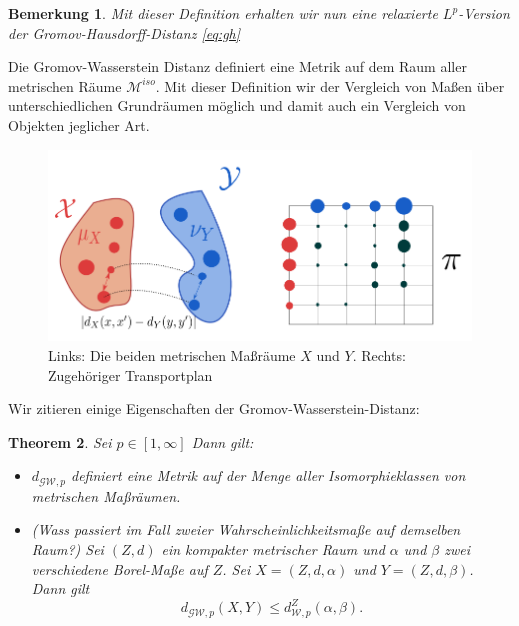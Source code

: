 \documentclass[11pt,a4paper]{article}
\newtheorem{theorem}{Theorem}[subsection]
\newtheorem{remark}[theorem]{Bemerkung}
\numberwithin{equation}{section}
\begin{document}
	\begin{remark}
		Mit dieser Definition erhalten wir nun eine relaxierte $L^p$-Version der Gromov-Hausdorff-Distanz \autoref{eq:gh}
	\end{remark}
	Die Gromov-Wasserstein Distanz definiert eine Metrik auf dem Raum aller metrischen Räume $\mathcal{M}^{iso}$. 
	Mit dieser Definition wir der Vergleich von Maßen über unterschiedlichen Grundräumen möglich und damit auch ein Vergleich von Objekten jeglicher Art.
	
	\begin{figure}[h]
		\begin{center}
			\includegraphics[width=0.3\textheight]{gwd_Transportplan.png}
			\caption[Beispiel der Gromov-Wasserstein-Distanz]{Links: Die beiden metrischen Maßräume $X$ und $Y$. Rechts: Zugehöriger Transportplan}
		\end{center}
	\end{figure}
	
	Wir zitieren einige Eigenschaften der Gromov-Wasserstein-Distanz:
	
	\begin{theorem}\cite[Thm. 5.1]{memoli2011gromov} Sei $p \in [1, \infty]$ Dann gilt:
		\begin{itemize}
			\item[(a)] $d_{\mathcal{GW},p}$ definiert eine Metrik auf der Menge aller Isomorphieklassen von metrischen Maßräumen. 
			\item[(b)] (Wass passiert im Fall zweier Wahrscheinlichkeitsmaße auf demselben Raum?) Sei $(Z,d)$ ein kompakter metrischer Raum und $\alpha$ und $\beta$ zwei verschiedene Borel-Maße auf $Z$. Sei $X=(Z,d,\alpha)$ und $Y=(Z,d,\beta)$. Dann gilt
			\begin{equation}
			d_{\mathcal{GW},p}(X,Y) \leq d_{\mathcal{W},p}^Z(\alpha,\beta).
			\end{equation}
		\end{itemize}
		
	\end{theorem}
	
\end{document}
